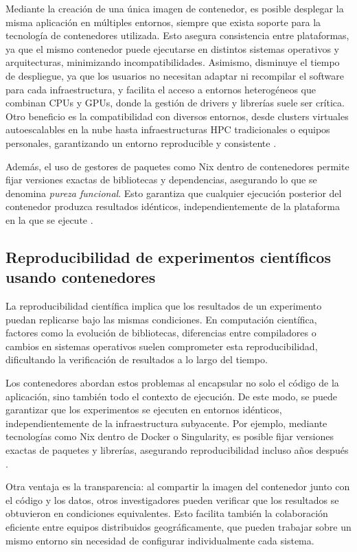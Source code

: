 Mediante la creación de una única imagen de contenedor, es posible desplegar la misma aplicación en múltiples entornos, siempre que exista soporte para la tecnología de contenedores utilizada. Esto asegura consistencia entre plataformas, ya que el mismo contenedor puede ejecutarse en distintos sistemas operativos y arquitecturas, minimizando incompatibilidades. Asimismo, disminuye el tiempo de despliegue, ya que los usuarios no necesitan adaptar ni recompilar el software para cada infraestructura, y facilita el acceso a entornos heterogéneos que combinan CPUs y GPUs, donde la gestión de drivers y librerías suele ser crítica. Otro beneficio es la compatibilidad con diversos entornos, desde clusters virtuales autoescalables en la nube hasta infraestructuras HPC tradicionales o equipos personales, garantizando un entorno reproducible y consistente \cite{Vaillancourt2020SelfScalingCA}.

Además, el uso de gestores de paquetes como Nix dentro de contenedores permite fijar versiones exactas de bibliotecas y dependencias, asegurando lo que se denomina \textit{pureza funcional}. Esto garantiza que cualquier ejecución posterior del contenedor produzca resultados idénticos, independientemente de la plataforma en la que se ejecute \cite{Vaillancourt2020SelfScalingCA}.

\subsection{Reproducibilidad de experimentos científicos usando contenedores}

La reproducibilidad científica implica que los resultados de un experimento puedan replicarse bajo las mismas condiciones. En computación científica, factores como la evolución de bibliotecas, diferencias entre compiladores o cambios en sistemas operativos suelen comprometer esta reproducibilidad, dificultando la verificación de resultados a lo largo del tiempo.

Los contenedores abordan estos problemas al encapsular no solo el código de la aplicación, sino también todo el contexto de ejecución. De este modo, se puede garantizar que los experimentos se ejecuten en entornos idénticos, independientemente de la infraestructura subyacente. Por ejemplo, mediante tecnologías como Nix dentro de Docker o Singularity, es posible fijar versiones exactas de paquetes y librerías, asegurando reproducibilidad incluso años después \cite{Vaillancourt2020SelfScalingCA}.

Otra ventaja es la transparencia: al compartir la imagen del contenedor junto con el código y los datos, otros investigadores pueden verificar que los resultados se obtuvieron en condiciones equivalentes. Esto facilita también la colaboración eficiente entre equipos distribuidos geográficamente, que pueden trabajar sobre un mismo entorno sin necesidad de configurar individualmente cada sistema.


